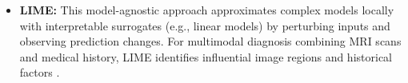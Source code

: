 \documentclass[pdflatex,sn-mathphys-num]{sn-jnl}%
\theoremstyle{thmstyleone}%
\theoremstyle{thmstyletwo}%
\theoremstyle{thmstylethree}%
\begin{document}
\begin{itemize}
    \item \textbf{LIME:} This model-agnostic approach approximates complex models locally with interpretable surrogates (e.g., linear models) by perturbing inputs and observing prediction changes. For multimodal diagnosis combining MRI scans and medical history, LIME identifies influential image regions and historical factors \cite{ribeiro2016whyitrustyou}. 


\end{itemize}
\end{document}
